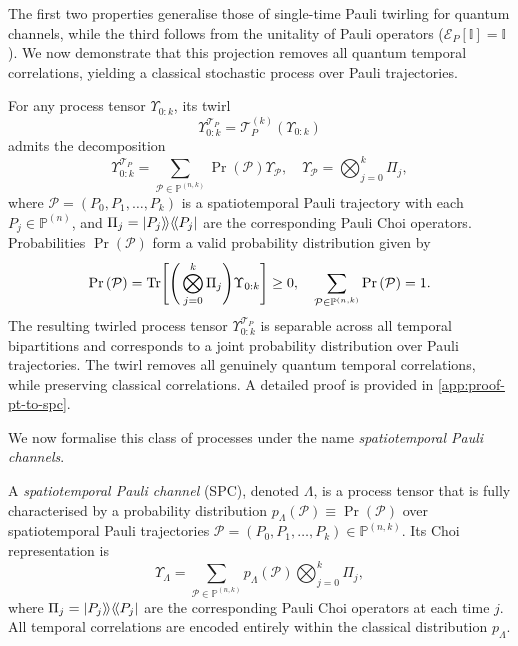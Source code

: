 The first two properties generalise those of single-time Pauli twirling for quantum channels, while the third follows from the unitality of Pauli operators (\(\mathcal{E}_P[\mathbb{I}] = \mathbb{I}\)). We now demonstrate that this projection removes all quantum temporal correlations, yielding a classical stochastic process over Pauli trajectories.
\begin{theorem}
    \label{thm:pt-to-spc}
  For any process tensor \(\Upsilon_{0:k}\), its twirl
  \begin{equation*}
    \Upsilon_{0:k}^{\mathcal{T}_P} = \mathcal{T}_P^{(k)}(\Upsilon_{0:k})
  \end{equation*}
  admits the decomposition
  \begin{equation}
    \Upsilon_{0:k}^{\mathcal{T}_P} = \sum_{\mathcal{P}\in\mathbb{P}^{(n,k)}}\Pr{(\mathcal{P})}\Upsilon_\mathcal{P}, \quad \Upsilon_\mathcal{P} = \bigotimes_{j=0}^k\Pi_j,
  \end{equation}
  where \(\mathcal{P} = (P_0, P_1, \ldots, P_k)\) is a spatiotemporal Pauli trajectory with each \(P_j \in \mathbb{P}^{(n)}\), and \(\Pi_j = | P_j \rangle \! \rangle \langle \! \langle P_j |\) are the corresponding Pauli Choi operators. Probabilities \(\Pr{(\mathcal{P})}\) form a valid probability distribution given by
  \begin{equation}\label{eq:spc-probabilities}
    \Pr{(\mathcal{P})} = \mathrm{Tr}\Bigg[\Bigg(\bigotimes_{j=0}^k\Pi_j\Bigg)\Upsilon_{0:k}\Bigg] \geq 0, \quad \sum_{\mathcal{P}\in\mathbb{P}^{(n,k)}} \Pr{(\mathcal{P})} = 1.
  \end{equation}
  The resulting twirled process tensor \(\Upsilon_{0:k}^{\mathcal{T}_P}\) is separable across all temporal bipartitions and corresponds to a joint probability distribution over Pauli trajectories. The twirl removes all genuinely quantum temporal correlations, while preserving classical correlations. A detailed proof is provided in \cref{app:proof-pt-to-spc}.
\end{theorem}
We now formalise this class of processes under the name \emph{spatiotemporal Pauli channels}.
\begin{definition}\label{def:def-spc}
A \emph{spatiotemporal Pauli channel} (SPC), denoted \(\Lambda\), is a process tensor that is fully characterised by a probability distribution 
\(p_\Lambda(\mathcal{P}) \equiv \Pr{(\mathcal{P})}\) over spatiotemporal Pauli trajectories 
\(\mathcal{P} = (P_0, P_1, \dots, P_k) \in \mathbb{P}^{(n,k)}\). 
Its Choi representation is
\begin{equation}
    \Upsilon_{\Lambda} = 
    \sum_{\mathcal{P}\in\mathbb{P}^{(n,k)}}
        p_\Lambda(\mathcal{P})
        \bigotimes_{j=0}^k\Pi_j,
\end{equation}
where \(\Pi_j = | P_j \rangle \! \rangle \langle \! \langle P_j |\) are the corresponding Pauli Choi operators at each time \(j\). All temporal correlations are encoded entirely within the classical distribution \(p_\Lambda\).
\end{definition}
